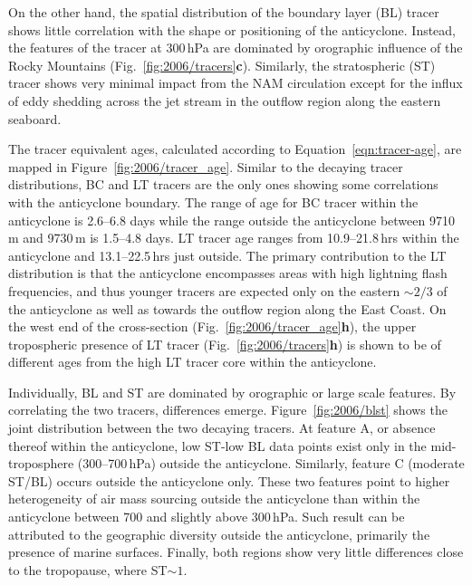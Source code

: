 On the other hand, the spatial distribution of the boundary layer (BL) tracer shows little correlation with the shape or positioning of the anticyclone. Instead,
the features of the tracer at 300\,\unit{hPa} are dominated by orographic influence of the Rocky Mountains (Fig.~\ref{fig:2006/tracers}{\bf c}).
Similarly, the stratospheric (ST) tracer shows very minimal impact from the NAM circulation except for the influx of eddy
shedding across the jet stream in the outflow region along the eastern seaboard.


The tracer equivalent ages, calculated according to Equation~\ref{eqn:tracer-age}, are mapped in Figure~\ref{fig:2006/tracer_age}.
Similar to the decaying tracer distributions, BC and LT tracers are the only ones showing some correlations with the anticyclone boundary.
The range of age for BC tracer within the anticyclone is 2.6--6.8 days while the range outside the anticyclone between 9710\,\unit{m} and
9730\,\unit{m} is 1.5--4.8 days. LT tracer age ranges from 10.9--21.8\,\unit{hrs} within the anticyclone and 13.1--22.5\,\unit{hrs}
just outside. The primary contribution to the LT distribution is that the anticyclone encompasses areas with high lightning flash frequencies,
and thus younger tracers are expected only on the eastern $\sim2/3$ of the anticyclone as well as towards the outflow region along
the East Coast. On the west end of the cross-section (Fig.~\ref{fig:2006/tracer_age}{\bf h}), the upper tropospheric presence of LT tracer
(Fig.~\ref{fig:2006/tracers}{\bf h}) is shown to be of different ages from the high LT tracer core within the anticyclone.


Individually, BL and ST are dominated by orographic or large scale features. By correlating the two tracers, differences emerge.
Figure~\ref{fig:2006/blst} shows the joint distribution between the two decaying tracers. At feature A, or absence thereof within the
anticyclone, low ST-low BL data points exist only in the mid-troposphere (300--700\,\unit{hPa}) outside the anticyclone. Similarly,
feature C (moderate ST/BL) occurs outside the anticyclone only. These two features point to higher heterogeneity of air mass sourcing
outside the anticyclone than within the anticyclone between 700 and slightly above 300\,\unit{hPa}. Such result can be attributed to
the geographic diversity outside the anticyclone, primarily the presence of marine surfaces. Finally, both regions show very little
differences close to the tropopause, where ST$\sim1$.

